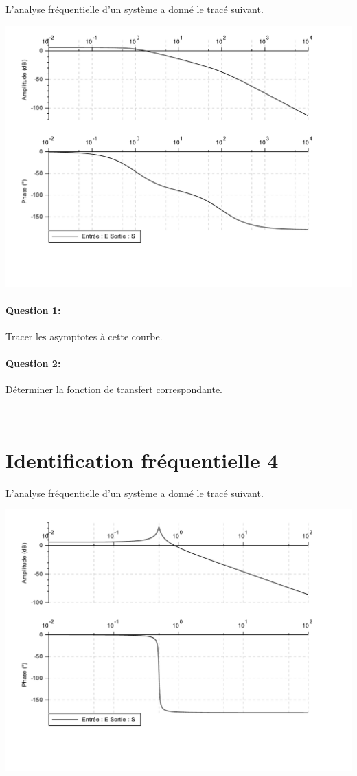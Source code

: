 L'analyse fréquentielle d'un système a donné le tracé suivant.

\begin{center}
 \includegraphics[width=0.8\linewidth]{img/Bode4}
\end{center} 

\paragraph{Question 1:} Tracer les asymptotes à cette courbe.

\paragraph{Question 2:} Déterminer la fonction de transfert correspondante.

\newpage ~\ \newpage

\section{Identification fréquentielle 4}

L'analyse fréquentielle d'un système a donné le tracé suivant.

\begin{center}
 \includegraphics[width=0.8\linewidth]{img/Bode3}
\end{center} 

